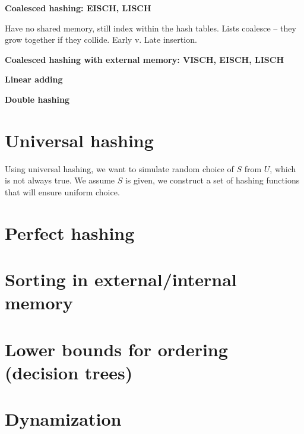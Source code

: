 {\bf Coalesced hashing: EISCH, LISCH}

Have no shared memory, still index within the hash tables. Lists coalesce -- they grow together if they collide.
Early v. Late insertion.

{\bf Coalesced hashing with external memory: VISCH, EISCH, LISCH}

{\bf Linear adding}

{\bf Double hashing}

\section{Universal hashing}

Using universal hashing, we want to simulate random choice of $S$ from $U$, which is not always true.
We assume $S$ is given, we construct a set of hashing functions that will ensure uniform choice.






\section{Perfect hashing}

\section{Sorting in external/internal memory}

\section{Lower bounds for ordering (decision trees)}


\section{Dynamization}


